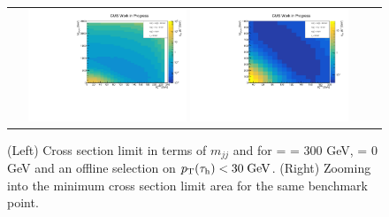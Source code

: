 \begin{figure}[tbh!]
	\centering
	\begin{tabular}{cc}
		\includegraphics[width=0.45\textwidth]{analysis/pics/JetInvMass_vs_MET_xsec_chi300_lsp000_taupt30.pdf}
		\includegraphics[width=0.45\textwidth]{analysis/pics/JetInvMass_vs_MET_xsec_chi300_lsp000_taupt30_zoom.pdf} 		
	\end{tabular}
	\caption{(Left) Cross section limit in terms of $m_{jj}$ and \met for \charginopm = \neutralinotwo = 300 GeV, \neutralinoone = 0 GeV and an offline selection on $p_{\text{T}}(\tau_{\text{h}}) <  30\;\text{Ge}\kern-0.06667em\text{V}$. (Right) Zooming into the minimum cross section limit area for the same benchmark point.}
	\label{fig::JetInvMass_vs_MET_xsec_chi300_lsp000_taupt30}
\end{figure}

